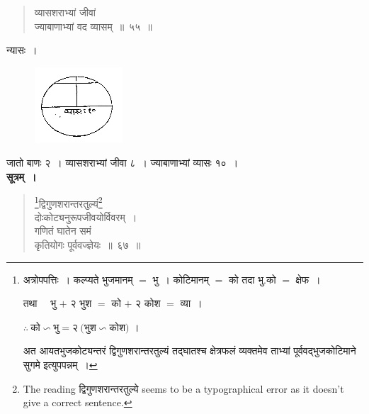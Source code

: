 \documentclass[11pt, openany]{book}
\begin{document}
\newpage%

\begin{quote}
    \bqt 
 व्यासशराभ्यां जीवां \\
 ज्याबाणाभ्यां वद व्यासम्~॥~५५~॥
\end{quote}

 न्यासः~। 
\vspace{-2mm}

\begin{figure}[h!]
    \centering
    \includegraphics[scale=0.85]{graphics/capture78.png}
\end{figure}
\vspace{-2mm}

 जातो बाणः २~। व्यासशराभ्यां जीवा ८~। ज्याबाणाभ्यां व्यासः १०~। \\

\setcounter{footnote}{0}
 \textbf{सूत्रम्~।} 
\begin{quote}
    \bs 
    \footnote{अत्रोपपत्तिः~। कल्प्यते भुजमानम् $=$ भु~। कोटिमानम् $=$
को\; तदा\; भु.को $=$ क्षेफ~। 
\hspace{1mm}

\hspace{4mm} तथा~~ भु $+$ २ भुश $=$ को $+$ २ कोश $=$ व्या~।
\hspace{1mm}

\hspace{4mm} $\therefore\ \mbox{को} \backsim \mbox{भु} = \mbox{२}\ (\mbox{भुश} \backsim \mbox{कोश)~। }$
\hspace{1mm}

\hspace{4mm} अत आयतभुजकोट्यन्तरं द्विगुणशरान्तरतुल्यं तद्घातश्च
क्षेत्रफलं व्यक्तमेव ताभ्यां पूर्ववद्भुजकोटिमाने सुगमे इत्युपपन्नम्~।}द्विगुणशरान्तरतुल्यं\footnote{The reading द्विगुणशरान्तरतुल्ये seems to be a typographical error as it doesn't give a correct sentence.} \\
दोःकोट्यनुरूपजीवयोर्विवरम्~।\\
गणितं घातेन समं \\
कृतियोगः पूर्ववज्ज्ञेयः~॥~६७~॥
\end{quote}
\end{document}
